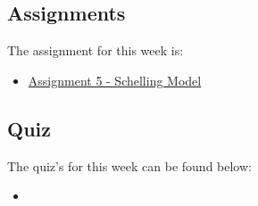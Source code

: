\subsection{Assignments}

The assignment for this week is:

\begin{itemize}
    \item \href{https://github.com/QuantumCompiler/CU/tree/main/CSPB%203702%20-%20Cognitive%20Science/CSPB%203702%20-%20Assignments/CSPB%203702%20-%20Assignment%205%20-%20Schelling%20Model}{Assignment 5 - Schelling Model}
\end{itemize}

\subsection{Quiz}

The quiz's for this week can be found below:

\begin{itemize}
    \item {}
\end{itemize}